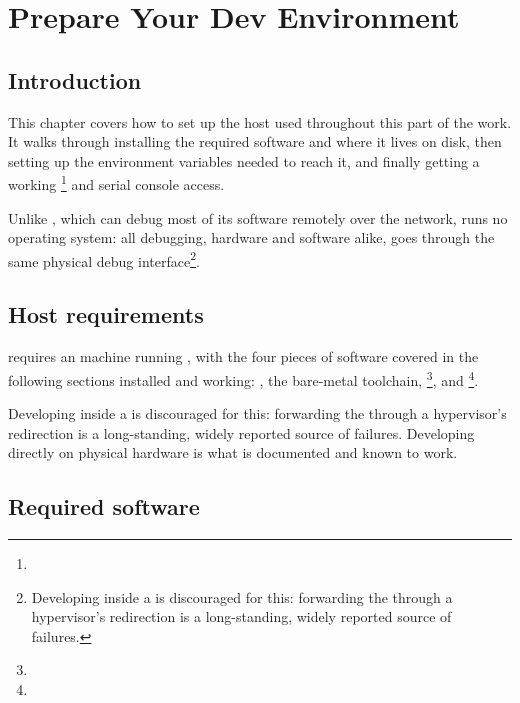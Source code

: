 \chapter{Prepare Your Dev Environment}
\label{chap:fpgasteel-devenv}

\section{Introduction}

This chapter covers how to set up the host used throughout this part of the work. It walks through installing the required software and where it lives on disk, then setting up the environment variables needed to reach it, and finally getting a working \footnote{} and serial console access.

Unlike , which can debug most of its software remotely over the network,  runs no operating system: all debugging, hardware and software alike, goes through the same physical debug interface\footnote{Developing inside a  is discouraged for this: forwarding the  through a hypervisor's  redirection is a long-standing, widely reported source of  failures.}.

\section{Host requirements}

 requires an  machine running , with the four pieces of software covered in the following sections installed and working: , the  bare-metal toolchain, \footnote{}, and \footnote{}.

Developing inside a  is discouraged for this: forwarding the  through a hypervisor's  redirection is a long-standing, widely reported source of  failures. Developing directly on physical  hardware is what is documented and known to work.

\section{Required software}

